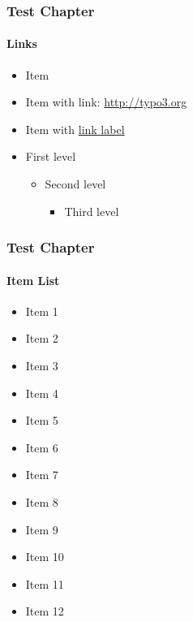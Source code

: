 
\begin{frame}
	\frametitle{Test Chapter}
	\framesubtitle{Links}

	\begin{itemize}
		\item Item
		\item Item with link: \url{http://typo3.org}
		\item Item with \href{http://typo3.org}{link label}

		\item First level
		\begin{itemize}
			\item Second level
			\begin{itemize}
				\item Third level
			\end{itemize}
		\end{itemize}

	\end{itemize}

\end{frame}


\begin{frame}
	\frametitle{Test Chapter}
	\framesubtitle{Item List}

	\begin{itemize}
		\item Item 1
		\item Item 2
		\item Item 3
		\item Item 4
		\item Item 5
		\item Item 6
		\item Item 7
		\item Item 8
		\item Item 9
		\item Item 10
		\item Item 11
		\item Item 12
	\end{itemize}

\end{frame}

